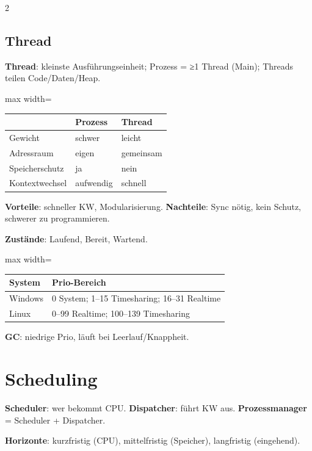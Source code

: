 \documentclass[10pt, a4paper]{article}
\begin{document}
\begin{multicols}{2}
\subsection{Thread}

\textbf{Thread}: kleinste Ausführungseinheit; Prozess = ≥1 Thread (Main); Threads teilen Code/Daten/Heap.



{\small
\begin{adjustbox}{max width=\linewidth}
{\scriptsize
\begin{tabular}{lll}
\toprule
\textbf{} & \textbf{Prozess} & \textbf{Thread} \\
\midrule
Gewicht & schwer & leicht \\
Adressraum & eigen & gemeinsam \\
Speicherschutz & ja & nein \\
Kontextwechsel & aufwendig & schnell \\
\bottomrule
\end{tabular}
}
\end{adjustbox}
}


\textbf{Vorteile}: schneller KW, Modularisierung. \textbf{Nachteile}: Sync nötig, kein Schutz, schwerer zu programmieren.


\textbf{Zustände}: Laufend, Bereit, Wartend.



{\small
\begin{adjustbox}{max width=\linewidth}
{\scriptsize
\begin{tabular}{ll}
\toprule
\textbf{System} & \textbf{Prio-Bereich} \\
\midrule
Windows & 0 System; 1–15 Timesharing; 16–31 Realtime \\
Linux & 0–99 Realtime; 100–139 Timesharing \\
\bottomrule
\end{tabular}
}
\end{adjustbox}
}


\textbf{GC}: niedrige Prio, läuft bei Leerlauf/Knappheit.



\section{Scheduling}

\textbf{Scheduler}: wer bekommt CPU. \textbf{Dispatcher}: führt KW aus. \textbf{Prozessmanager} = Scheduler + Dispatcher.


\textbf{Horizonte}: kurzfristig (CPU), mittelfristig (Speicher), langfristig (eingehend).




\end{multicols}
\end{document}
